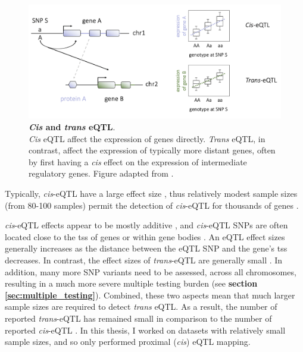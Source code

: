 \begin{figure}[h]
\centering
\includegraphics[width=15cm]{Chapter1/Fig/eqtl.png}
\caption[\textit{Cis} and \textit{trans} eQTL]{\textbf{\textit{Cis} and \textit{trans} eQTL}.\\
\textit{Cis} eQTL affect the expression of genes directly. 
\textit{Trans} eQTL, in contrast, affect the expression of typically more distant genes, often by first having a \textit{cis} effect on the expression of intermediate regulatory genes.
Figure adapted from \cite{westra2014genome}.
}
\label{fig:eqtl}
\end{figure}


Typically, \textit{cis}-eQTL have a large effect size \cite{sherman2009systematic}, thus relatively modest sample sizes (from 80-100 samples) permit the detection of \textit{cis}-eQTL for thousands of genes \cite{stranger2007population, myers2007survey}.

\textit{cis}-eQTL effects appear to be mostly additive \cite{powell2013congruence}, and \textit{cis}-eQTL SNPs are often located close to the \gls{tss} of genes or within gene bodies \cite{vosa2018unraveling}. 
An eQTL effect sizes generally increases as the distance between the eQTL SNP and the gene's \gls{tss} decreases.
In contrast, the effect sizes of \textit{trans}-eQTL are generally small \cite{cookson2009mapping, grundberg2012mapping}. 
In addition, many more SNP variants need to be assessed, across all chromosomes, resulting in a much more severe multiple testing burden (see \textbf{section \ref{sec:multiple_testing}}).
Combined, these two aspects mean that much larger sample sizes are required to detect \textit{trans} eQTL.
As a result, the number of reported \textit{trans}-eQTL has remained small \cite{grundberg2012mapping} in comparison to the number of reported \textit{cis}-eQTL \cite{westra2014genome}.
In this thesis, I worked on datasets with relatively small sample sizes, and so only performed proximal (\textit{cis}) eQTL mapping.

